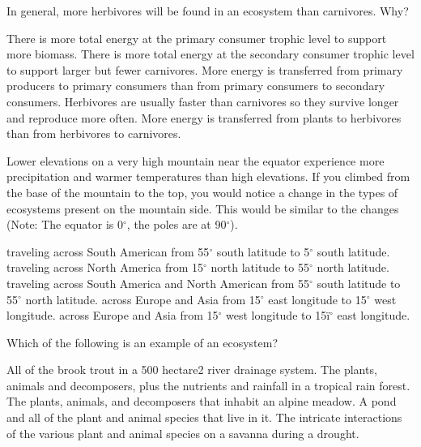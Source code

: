 \question
In general, more herbivores will be found in an ecosystem than carnivores. Why?

\begin{choices}
\correctchoice There is more total energy at the primary consumer trophic level to support more biomass.%
\choice There is more total energy at the secondary consumer trophic level to support larger but fewer carnivores.%
\choice More energy is transferred from primary producers to primary consumers than from primary consumers to secondary consumers.%
\choice Herbivores are usually faster than carnivores so they survive longer and reproduce more often.%
\choice More energy is transferred from plants to herbivores than from herbivores to carnivores.%
\end{choices}

\question
Lower elevations on a very high mountain near the equator experience more precipitation and warmer temperatures than high elevations. If you climbed from the base of the mountain to the top, you would notice a change in the types of ecosystems present on the mountain side. This would be similar to the changes (Note: The equator is 0$^\circ$, the poles are at 90$^\circ$). 

\begin{choices}
\choice traveling across South American from 55$^\circ$ south latitude to 5$^\circ$ south latitude.%
\correctchoice traveling across North America from 15$^\circ$ north latitude to 55$^\circ$ north latitude.%
\choice traveling across South America and North American from 55$^\circ$ south latitude to 55$^\circ$ north latitude.%
\choice across Europe and Asia from 15$^\circ$ east longitude to 15$^\circ$ west longitude.%
\choice across Europe and Asia from 15$^\circ$ west longitude to 15ï$^\circ$ east longitude.%
\end{choices}


\question
Which of the following is an example of an ecosystem?

\begin{choices}
\choice All of the brook trout in a 500 hectare2 river drainage system.%
\correctchoice The plants, animals and decomposers, plus the nutrients and rainfall in a tropical rain forest.%
\choice The plants, animals, and decomposers that inhabit an alpine meadow.%
\choice A pond and all of the plant and animal species that live in it.%
\choice The intricate interactions of the various plant and animal species on a savanna during a drought.%
\end{choices}

